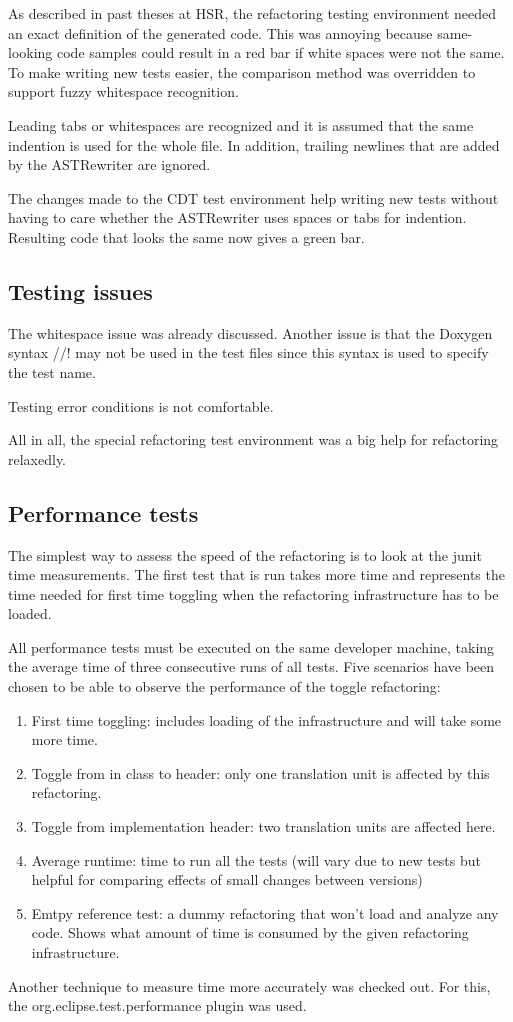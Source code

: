As described in past theses at HSR, the refactoring testing environment
needed an exact definition of the generated code. This was annoying because
same-looking code samples could result in a red bar if white spaces were not the
same. To make writing new tests easier, the comparison method was overridden to
support fuzzy whitespace recognition.

Leading tabs or whitespaces are recognized and it is assumed that the same
indention is used for the whole file. In addition, trailing newlines that are
added by the ASTRewriter are ignored.

The changes made to the CDT test environment help writing new tests without
having to care whether the ASTRewriter uses spaces or tabs for indention.
Resulting code that looks the same now gives a green bar.

\subsection{Testing issues}

The whitespace issue was already discussed. Another issue is that the Doxygen 
syntax //! may not be used in the test files since this syntax is used to 
specify the test name.

Testing error conditions is not comfortable. %

All in all, the special refactoring test environment was a big help for 
refactoring relaxedly.

\subsection{Performance tests}

The simplest way to assess the speed of the refactoring is to look at the junit 
time measurements. The first test that is run takes more time and represents the 
time needed for first time toggling when the refactoring infrastructure has to 
be loaded. 

All performance tests must be executed on the same developer machine, taking the 
average time of three consecutive runs of all tests. Five scenarios have been 
chosen to be able to observe the performance of the toggle refactoring:

\begin{enumerate}
\item First time toggling: includes loading of the infrastructure and will take 
some more time.
\item Toggle from in class to header: only one translation unit is affected by 
this refactoring.
\item Toggle from implementation header: two translation units are affected here.
\item Average runtime: time to run all the tests (will vary due to new tests but 
helpful for comparing effects of small changes between versions)
\item Emtpy reference test: a dummy refactoring that won't load and analyze any 
code. Shows what amount of time is consumed by the given refactoring 
infrastructure.
\end{enumerate}

Another technique to measure time more accurately was checked out. For this, the 
org.eclipse.test.performance plugin was used. 


